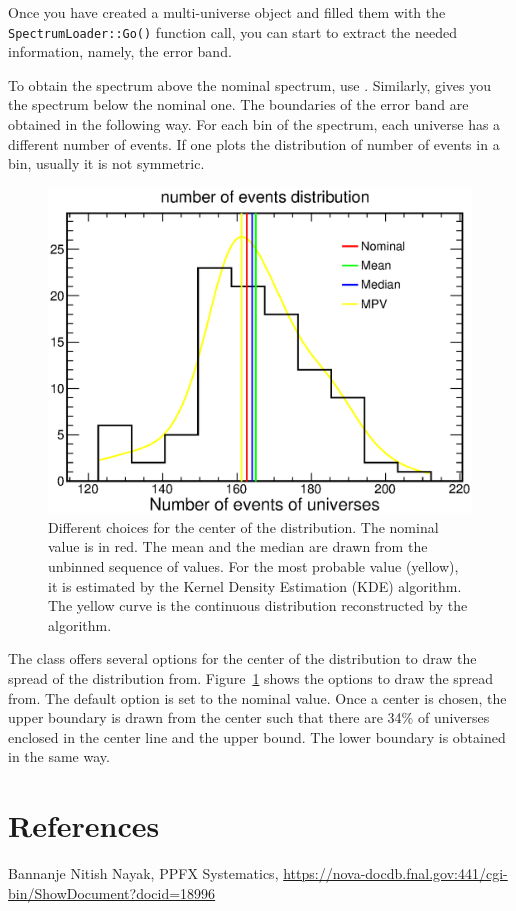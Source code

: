 \documentclass[12pt,a4paper,final]{iopart}
\begin{document}
Once you have created a multi-universe object and filled them with the \texttt{SpectrumLoader::Go()} function call, you can start to extract the needed information, namely, the error band.

To obtain the spectrum above the nominal spectrum, use . Similarly,  gives you the spectrum below the nominal one. The boundaries of the error band are obtained in the following way. For each bin of the spectrum, each universe has a different number of events. If one plots the distribution of number of events in a bin, usually it is not symmetric.
\begin{figure}\label{spread}
  \centering
  \includegraphics[width=.6\textwidth]{figures/spread_from_different_points.eps}
  \caption{Different choices for the center of the distribution. The nominal value is in red. The mean and the median are drawn from the unbinned sequence of values. For the most probable value (yellow), it is estimated by the Kernel Density Estimation (KDE) algorithm. The yellow curve is the continuous distribution reconstructed by the algorithm.}
\end{figure}
The class offers several options for the center of the distribution to draw the spread of the distribution from. Figure~\ref{spread} shows the options to draw the spread from. The default option is set to the nominal value. Once a center is chosen, the upper boundary is drawn from the center such that there are 34\% of universes enclosed in the center line and the upper bound. The lower boundary is obtained in the same way.

\section*{References}
\begin{thebibliography}{10}
   Bannanje Nitish Nayak, PPFX Systematics, \url{https://nova-docdb.fnal.gov:441/cgi-bin/ShowDocument?docid=18996}
\end{thebibliography}
  
\end{document}
